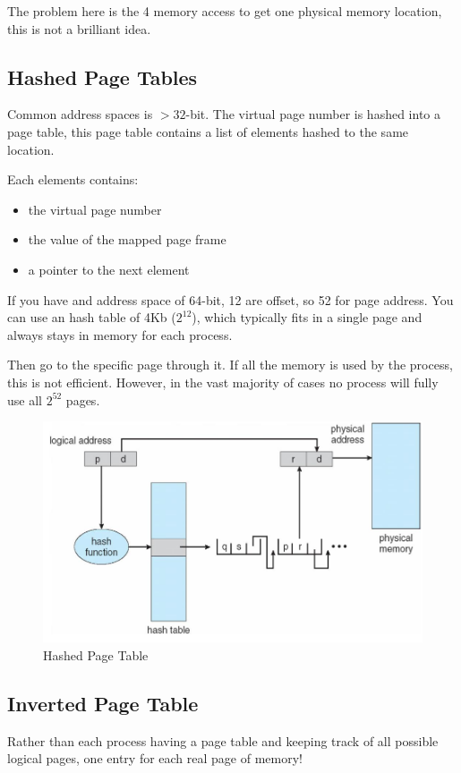 The problem here is the 4 memory access to get one physical memory location, this is not a brilliant idea.

\newpage
\subsection{Hashed Page Tables}
Common address spaces is $> 32$-bit. The virtual page number is hashed into a page table, this page table contains a list of elements hashed to the same location.

Each elements contains:

\begin{itemize}
    \item the virtual page number
    \item the value of the mapped page frame
    \item a pointer to the next element
\end{itemize}

If you have and address space of 64-bit, 12 are offset, so 52 for page address. You can use an hash table of 4Kb ($2^{12}$), which typically fits in a single page and always stays in memory for each process. 

Then go to the specific page through it. If all the memory is used by the process, this is not efficient. However, in the vast majority of cases no process will fully use all $2^{52}$ pages.


\begin{figure}[h!]
    \centering
    \includegraphics[width=0.75\linewidth]{img/ngf.png}
    \caption{Hashed Page Table}
\end{figure}

\subsection{Inverted Page Table}

Rather than each process having a page table and keeping track of all
possible logical pages, one entry for each real page of memory!

